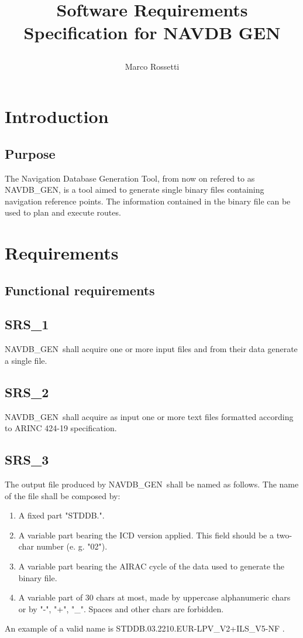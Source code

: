\documentclass{scrreprt}
\title{Software Requirements Specification for NAVDB GEN 

\VERSION}
\author{Marco Rossetti}
\def\NAVDBGEN{NAVDB\_GEN}
\begin{document}
\maketitle
\tableofcontents
\chapter{Introduction}
\section{Purpose}
The Navigation Database Generation Tool, from now on refered to as \NAVDBGEN, is a tool aimed to
generate single binary files containing navigation reference points.
The information contained in the binary file can be used to plan and execute routes.
\chapter{Requirements}
\section{Functional requirements}
\setcounter{secnumdepth}{0}
\section{SRS\_1}
\label{SRS:1}
\NAVDBGEN\ shall acquire one or more input files and from their data generate a single file.
\section{SRS\_2}
\label{SRS:2}
\NAVDBGEN\ shall acquire as input one or more text files formatted according to ARINC 424-19 specification.
\section{SRS\_3}
\label{SRS:3}
The output file produced by \NAVDBGEN\ shall be named as follows. The name of the file shall be composed by:
\begin{enumerate}
\item A fixed part "STDDB.".
\item A variable part bearing the ICD version applied. This field should be a two-char number (e. g. "02").
\item A variable part bearing the AIRAC cycle of the data used to generate the binary file.
\item A variable part of 30 chars at most, made by uppercase alphanumeric chars or by "-", "+", "\_". Spaces and other chars are forbidden.
\end{enumerate}
An example of a valid name is STDDB.03.2210.EUR-LPV\_V2+ILS\_V5-NF .
\end{document}
